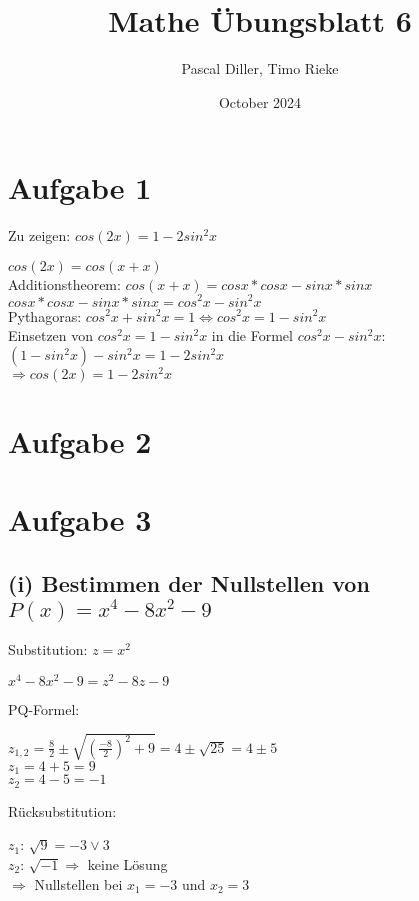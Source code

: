 \documentclass{article}
\title{Mathe Übungsblatt 6}
\author{Pascal Diller, Timo Rieke}
\date{October 2024}
\begin{document}
\maketitle

\section{Aufgabe 1}
Zu zeigen: $cos(2x) = 1 - 2 sin^2 x$ 
\begin{center}
    $cos(2x) = cos(x+x)$ \\
    Additionstheorem: $cos(x+x) = cos x * cosx - sinx* sinx$ \\
    $cosx*cosx-sinx*sinx = cos^2x - sin^2x$ \\
    Pythagoras: $cos^2x+sin^2x=1 \Longleftrightarrow cos^2x = 1-sin^2x$ \\
    Einsetzen von $cos^2x = 1-sin^2x$ in die Formel $cos^2x - sin^2x$:\\
    $(1-sin^2x) - sin^2x = 1- 2sin^2x$\\
    $\Longrightarrow cos(2x) = 1-2sin^2x$ 
\end{center}

\section{Aufgabe 2}

\section{Aufgabe 3}
\subsection{(i) Bestimmen der Nullstellen von $P(x)=x^4-8x^2-9$}
Substitution: $z=x^2$ 
\begin{center}
    $x^4-8x^2-9=z^2-8z-9$
\end{center}
PQ-Formel: 
\begin{center}
    $z_{1,2}=\frac{8}{2} \pm \sqrt{(\frac{-8}{2})^2 + 9} = 4 \pm \sqrt{25} = 4 \pm 5$ \\
    $z_1=4+5=9$ \\
    $z_2=4-5=-1$
\end{center}
Rücksubstitution:
\begin{center}
    $z_1$: $\sqrt{9} = -3 \lor 3$ \\
    $z_2$: $\sqrt{-1} \Longrightarrow$ keine Lösung \\
    $\Longrightarrow$ Nullstellen bei $x_1 = -3$ und $x_2 = 3$
\end{center}
\end{document}
